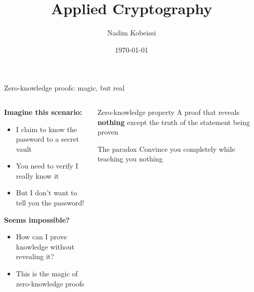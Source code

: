 \documentclass[aspectratio=169, lualatex, handout]{beamer}
\title{Applied Cryptography}
\author{Nadim Kobeissi}
\institute{American University of Beirut}
\date{\today}
\begin{document}
\begin{frame}[plain]
	\titlepage
\end{frame}

%

\incompleteslideswarning

\begin{frame}{Zero-knowledge proofs: magic, but real}
	\begin{columns}[c]
		\begin{column}{0.5\textwidth}
			\textbf{Imagine this scenario:}
			\begin{itemize}
				\item I claim to know the password to a secret vault
				\item You need to verify I really know it
				\item But I don't want to tell you the password!
			\end{itemize}
			\vspace{0.5em}
			\textbf{Seems impossible?}
			\begin{itemize}
				\item How can I prove knowledge without revealing it?
				\item This is the magic of zero-knowledge proofs
			\end{itemize}
		\end{column}
		\begin{column}{0.5\textwidth}
			\begin{block}{Zero-knowledge property}
				A proof that reveals \textbf{nothing} except the truth of the statement being proven
			\end{block}
			\vspace{0.5em}
			\begin{alertblock}{The paradox}
				Convince you completely while teaching you nothing
			\end{alertblock}
		\end{column}
	\end{columns}
\end{frame}
\end{document}
